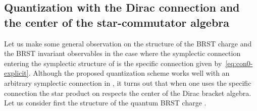 \documentclass[a4paper,11pt]{amsart}
\numberwithin{thm}{section} %
\numberwithin{equation}{section} %
\numberwithin{figure}{section} %
\renewcommand{\:}{{\rm\, :\,}}
\def\bar{\overline}
\def\manM{{\mathcal M}}
\def\E{{ \mathcal E}}
\def\W{{\bf W}}
\def\con{{\bar\Gamma}}
\begin{document}
\subsection{Quantization with the Dirac connection and the center of
  the star-commutator algebra}\label{subsec:special}
Let us make some general observation on the structure of the BRST
charge and the BRST invariant observables in the case where the
symplectic connection \myHighlight{$\con$}\coordHE{} entering the symplectic structure
of \myHighlight{$\E$}\coordHE{} is the specific connection \myHighlight{$\con^0$}\coordHE{} given by~\eqref{eq:con0-explicit}.
Although the proposed quantization scheme works well with an
arbitrary symplectic connection in \myHighlight{$\W(\manM)$}\coordHE{}, it
turns out that when one uses the specific connection \myHighlight{$\con^0$}\coordHE{}
the star product on \myHighlight{$\manM$}\coordHE{} respects the center of the
Dirac bracket algebra. Let us
consider first the structure of the quantum BRST charge
\myHighlight{$\hat\Omega$}\coordHE{}.
\end{document}
